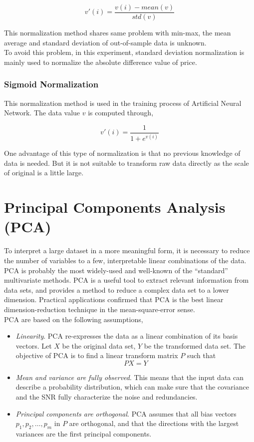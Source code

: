\begin{equation}
v'(i)=\frac{v(i)-mean(v)}{std(v)}
\end{equation}

This normalization method shares same problem with min-max, the mean average and standard deviation of out-of-sample data is unknown.\\

To avoid this problem, in this experiment, standard deviation normalization is mainly used to normalize the absolute difference value of price.

\subsubsection{Sigmoid Normalization}
\label{subsubsec:sigmoid}
This normalization method is used in the training process of Artificial Neural Network. The data value $v$ is computed through\cite{nayak2014impact},

\begin{equation}
v'(i)=\frac{1}{1+e^{v(i)}}
\end{equation}

One advantage of this type of normalization is that no previous knowledge of data is needed. But it is not suitable to transform raw data directly as the scale of original is a little large.

\section{Principal Components Analysis (PCA)}
To interpret a large dataset in a more meaningful form, it is necessary to reduce the number of variables to a few, interpretable linear combinations of the data. PCA is probably the most widely-used and well-known of the “standard” multivariate methods. PCA is a useful tool to extract relevant information from data sets, and provides a method to reduce a complex data set to a lower dimension. Practical applications confirmed that PCA is the best linear dimension-reduction technique in the mean-square-error sense\cite{4_kantardzic}.\\


PCA are based on the following assumptions\cite{shlens2014tutorial},
\begin{itemize}
	\item \emph{Linearity}. PCA re-expresses the data as a linear combination of its basis vectors. Let $ X $ be the original data set, $ Y $ be the transformed data set. The objective of PCA is to find a linear transform matrix $ P $ such that
	\begin{equation}
	PX=Y
	\end{equation}
	\item \emph{Mean and variance are fully observed}. This means that the input data can describe a probability distribution, which can make sure that the covariance and the SNR fully characterize the noise and redundancies.
	\item \emph{Principal components are orthogonal}. PCA assumes that all bias vectors $ {p_1, p_2, \ldots, p_m} $ in $ P $ are orthogonal, and that the directions with the largest variances are the first principal components.
\end{itemize}

